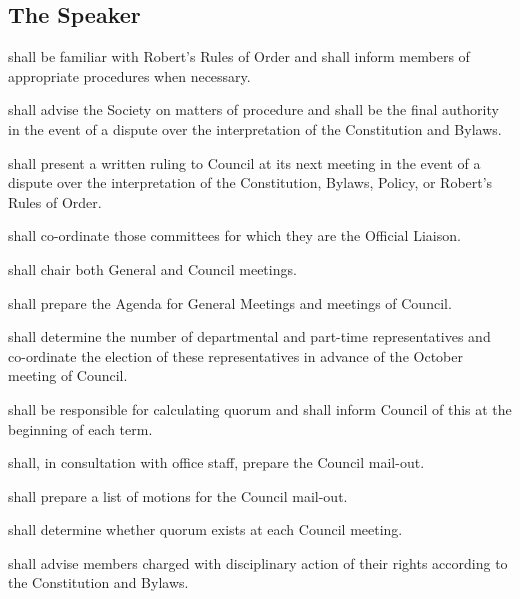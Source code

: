 \subsection {The Speaker}
\begin{longenum}[ label*=\thesubsection.\arabic*., align=left]
	\item shall be familiar with Robert's Rules of Order and shall inform members of  appropriate procedures when necessary.
    \item shall advise the Society on matters of procedure and shall be the final authority in the event of a dispute over the interpretation of the Constitution and Bylaws.
    \item shall present a written ruling to Council at its  next meeting in the event of a dispute over the interpretation of the Constitution, Bylaws, Policy, or Robert's Rules of Order.
    \item shall co-ordinate those committees for which they are the Official Liaison.
    \item shall chair both General and Council meetings.
    \item shall prepare the Agenda for General Meetings and meetings of Council.
    \item shall determine the number of departmental and part-time representatives and co-ordinate the election of these representatives in advance of the October meeting of Council.
    \item shall be responsible for calculating quorum and shall inform Council of this at the beginning of each term.
    \item shall, in consultation with office staff, prepare the Council mail-out.
    \item shall prepare a list of motions for the Council mail-out.
    \item shall determine whether quorum exists at each Council meeting.
    \item shall advise members charged with disciplinary action of their rights according to the Constitution and Bylaws.

\end{longenum}
